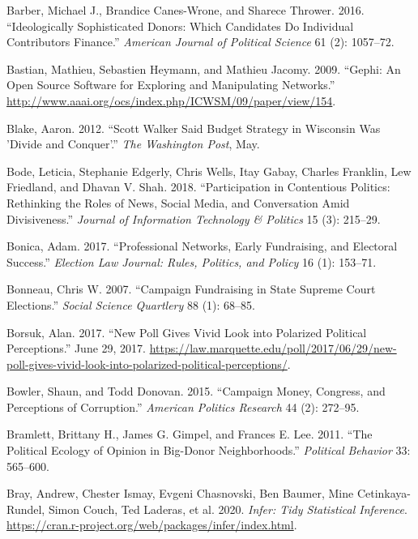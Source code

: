 \documentclass[12pt,]{article}
\begin{document}
\leavevmode\hypertarget{ref-barber2016c}{}%
Barber, Michael J., Brandice Canes-Wrone, and Sharece Thrower. 2016.
``Ideologically Sophisticated Donors: Which Candidates Do Individual
Contributors Finance.'' \emph{American Journal of Political Science} 61
(2): 1057--72.

\leavevmode\hypertarget{ref-gephi}{}%
Bastian, Mathieu, Sebastien Heymann, and Mathieu Jacomy. 2009. ``Gephi:
An Open Source Software for Exploring and Manipulating Networks.''
\url{http://www.aaai.org/ocs/index.php/ICWSM/09/paper/view/154}.

\leavevmode\hypertarget{ref-blake2012}{}%
Blake, Aaron. 2012. ``Scott Walker Said Budget Strategy in Wisconsin Was
'Divide and Conquer'.'' \emph{The Washington Post}, May.

\leavevmode\hypertarget{ref-bode2018}{}%
Bode, Leticia, Stephanie Edgerly, Chris Wells, Itay Gabay, Charles
Franklin, Lew Friedland, and Dhavan V. Shah. 2018. ``Participation in
Contentious Politics: Rethinking the Roles of News, Social Media, and
Conversation Amid Divisiveness.'' \emph{Journal of Information
Technology \& Politics} 15 (3): 215--29.

\leavevmode\hypertarget{ref-bonica2017}{}%
Bonica, Adam. 2017. ``Professional Networks, Early Fundraising, and
Electoral Success.'' \emph{Election Law Journal: Rules, Politics, and
Policy} 16 (1): 153--71.

\leavevmode\hypertarget{ref-bonneau2007}{}%
Bonneau, Chris W. 2007. ``Campaign Fundraising in State Supreme Court
Elections.'' \emph{Social Science Quartlery} 88 (1): 68--85.

\leavevmode\hypertarget{ref-borsuk2017}{}%
Borsuk, Alan. 2017. ``New Poll Gives Vivid Look into Polarized Political
Perceptions.'' June 29, 2017.
\url{https://law.marquette.edu/poll/2017/06/29/new-poll-gives-vivid-look-into-polarized-political-perceptions/}.

\leavevmode\hypertarget{ref-bowler2015}{}%
Bowler, Shaun, and Todd Donovan. 2015. ``Campaign Money, Congress, and
Perceptions of Corruption.'' \emph{American Politics Research} 44 (2):
272--95.

\leavevmode\hypertarget{ref-bramlett2011}{}%
Bramlett, Brittany H., James G. Gimpel, and Frances E. Lee. 2011. ``The
Political Ecology of Opinion in Big-Donor Neighborhoods.''
\emph{Political Behavior} 33: 565--600.

\leavevmode\hypertarget{ref-infer}{}%
Bray, Andrew, Chester Ismay, Evgeni Chasnovski, Ben Baumer, Mine
Cetinkaya-Rundel, Simon Couch, Ted Laderas, et al. 2020. \emph{Infer:
Tidy Statistical Inference}.
\url{https://cran.r-project.org/web/packages/infer/index.html}.
\end{document}
